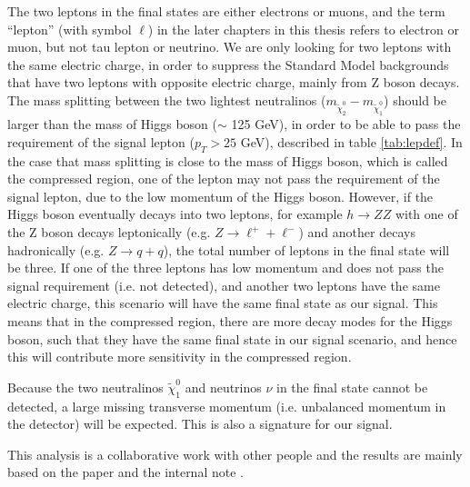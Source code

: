 The two leptons in the final states are either electrons or muons, and the term ``lepton'' (with symbol $\ell$) in the later chapters in this thesis refers to electron or muon, but not tau lepton or neutrino.
We are only looking for two leptons with the same electric charge, in order to suppress the Standard Model backgrounds that have two leptons with opposite electric charge, mainly from Z boson decays.
The mass splitting between the two lightest neutralinos ($m_{\tilde{\chi}_2^0} - m_{\tilde{\chi}_1^0}$) should be larger than the mass of Higgs boson ($\sim$ 125 GeV), in order to be able to pass the requirement of the signal lepton ($p_T > 25$ GeV), described in table \ref{tab:lepdef}.
In the case that mass splitting is close to the mass of Higgs boson, which is called the compressed region, one of the lepton may not pass the requirement of the signal lepton, due to the low momentum of the Higgs boson.
However, if the Higgs boson eventually decays into two leptons, for example $h \rightarrow ZZ$ with one of the Z boson decays leptonically (e.g. $Z \rightarrow \ell^{+} + \ell^{-}$) and another decays hadronically (e.g. $Z \rightarrow q + q$), the total number of leptons in the final state will be three.
If one of the three leptons has low momentum and does not pass the signal requirement (i.e. not detected), and another two leptons have the same electric charge, this scenario will have the same final state as our signal.
This means that in the compressed region, there are more decay modes for the Higgs boson, such that they have the same final state in our signal scenario, and hence this will contribute more sensitivity in the compressed region.

Because the two neutralinos $\tilde{\chi}_1^0$ and neutrinos $\nu$ in the final state cannot be detected, a large missing transverse momentum (i.e. unbalanced momentum in the detector) will be expected.
This is also a signature for our signal.

This analysis is a collaborative work with other people and the results are mainly based on the paper \cite{Wh} and the internal note \cite{WhSS}.
